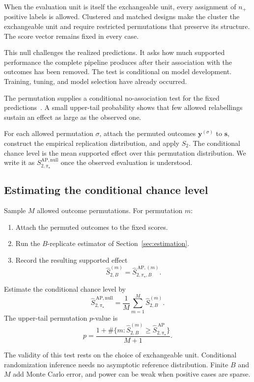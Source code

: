 \documentclass[11pt]{article}
\newcommand{\SAPHat}{\widehat S_{2,\pi_\star}^{\,\mathrm{AP}}}
\newcommand{\SAPnull}{S_{2,\pi_\star}^{\mathrm{AP,null}}}
\newcommand{\SAPnullHat}{\widehat S_{2,\pi_\star}^{\,\mathrm{AP,null}}}
\theoremstyle{remark}
\begin{document}
When the evaluation unit is itself the exchangeable unit, every assignment of $n_+$ positive labels is allowed. Clustered and matched designs make the cluster the exchangeable unit and require restricted permutations that preserve its structure. The score vector remains fixed in every case.

This null challenges the realized predictions. It asks how much supported performance the complete pipeline produces after their association with the outcomes has been removed. The test is conditional on model development. Training, tuning, and model selection have already occurred.

The permutation supplies a conditional no-association test for the fixed predictions~\cite{ojala2010permutation}. A small upper-tail probability shows that few allowed relabellings sustain an effect as large as the observed one.

For each allowed permutation $\sigma$, attach the permuted outcomes $\mathbf{y}^{(\sigma)}$ to $\mathbf{s}$, construct the empirical replication distribution, and apply $S_2$. The conditional chance level is the mean supported effect over this permutation distribution. We write it as $\SAPnull$ once the observed evaluation is understood.

\subsection{Estimating the conditional chance level}

Sample $M$ allowed outcome permutations. For permutation $m$:
\begin{enumerate}
\item Attach the permuted outcomes to the fixed scores.
\item Run the $B$-replicate estimator of Section~\ref{sec:estimation}.
\item Record the resulting supported effect
\[
\widehat S_{2,B}^{(m)}
=
\widehat S_{2,\pi_\star,B}^{\,\mathrm{AP},(m)}.
\]
\end{enumerate}

Estimate the conditional chance level by
\begin{equation}
\SAPnullHat
=
\frac{1}{M}\sum_{m=1}^{M}\widehat S_{2,B}^{(m)}.
\label{eq:conditional-null}
\end{equation}
The upper-tail permutation $p$-value is
\[
p
=
\frac{1+\#\{m:\widehat S_{2,B}^{(m)}\geq\SAPHat\}}{M+1}.
\]

The validity of this test rests on the choice of exchangeable unit. Conditional randomization inference needs no asymptotic reference distribution. Finite $B$ and $M$ add Monte Carlo error, and power can be weak when positive cases are sparse.
\end{document}
